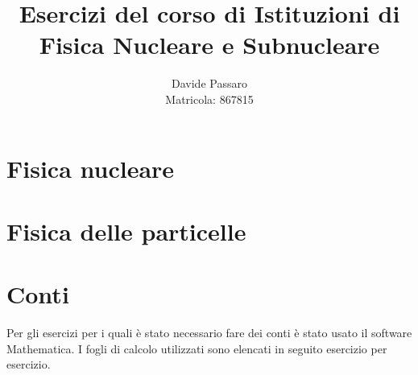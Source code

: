 \documentclass[10pt, a4paper]{article}
\title{Esercizi del corso di Istituzioni di Fisica Nucleare e Subnucleare}
\author{Davide Passaro \\ Matricola: 867815}
\date{}
\theoremstyle{plain}
\begin{document}
	\maketitle
	\section{Fisica nucleare}
		
		
		
		
	\section{Fisica delle particelle}
		
		
		
		
	\section{Conti}
		Per gli esercizi per i quali è stato necessario fare dei conti è stato usato il software Mathematica. I fogli di calcolo utilizzati sono elencati in seguito esercizio per esercizio.
		
		
		
		
		
		
\end{document}
